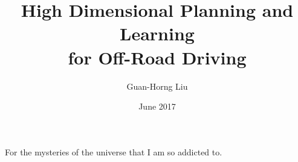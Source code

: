 \documentclass[hidelinks, 12pt]{cmuthesis}
\begin{document}
 
\frontmatter

\pagestyle{empty}

\title{ %
{\bf High Dimensional Planning and Learning \\ \protect for Off-Road Driving}}
\author{Guan-Horng Liu}
\date{June 2017}


\support{}
\disclaimer{}



\maketitle

\begin{dedication}
For the mysteries of the universe that I am so addicted to.
\end{dedication}

\pagestyle{plain}
\end{document}
